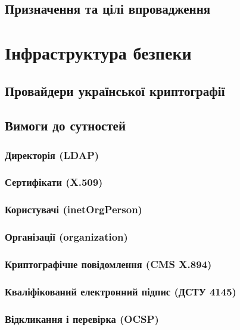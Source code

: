 \subsection{Призначення та цілі впровадження}

\newpage
\section{Інфраструктура безпеки}

\subsection{Провайдери української криптографії}

\subsection{Вимоги до сутностей}

\subsubsection{Директорія (LDAP)}

\subsubsection{Сертифікати (X.509)}

\subsubsection{Користувачі (inetOrgPerson)}

\subsubsection{Організації (organization)}

\subsubsection{Криптографічне повідомлення (CMS X.894)}

\subsubsection{Кваліфікований електронний підпис (ДСТУ 4145)}

\subsubsection{Відкликання і перевірка (OCSP)}

